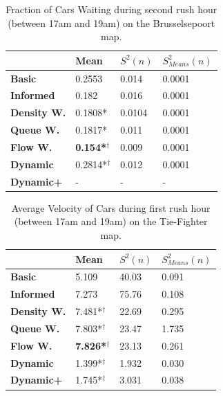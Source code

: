 \documentclass[11pt]{article}
\begin{document}
\begin{table}[H]
\centering
\caption{Fraction of Cars Waiting during second rush hour (between 17am and 19am) on the Brusselsepoort map.}
\label{my-label}
\begin{tabular}{l|l|l|l|}
\textbf{}                 & \textbf{Mean} & \textbf{$S^2(n)$} & \textbf{$S_{Means}^2(n)$} \\
\hline\textbf{Basic}      & 0.2553         & 0.014             & 0.0001                     \\
\textbf{Informed}   & 0.182          & 0.016             & 0.0001                     \\
\hline\textbf{Density W.} & 0.1808*         & 0.0104            & 0.0001                     \\
\textbf{Queue W.}   & 0.1817*         & 0.011             & 0.0001                     \\
\textbf{Flow W.}    & \textbf{0.154*$^\dagger$} & 0.009             & 0.0001                     \\
\textbf{Dynamic}    & 0.2814*$^\dagger$         & 0.012             & 0.0001                     \\
\textbf{Dynamic+}   & -              & -                 & -                         
\end{tabular}
\end{table}

\begin{table}[H]
\centering
\caption{Average Velocity of Cars during first rush hour (between 17am and 19am) on the Tie-Fighter map.}
\label{my-label}
\begin{tabular}{l|l|l|l|}
\textbf{}                 & \textbf{Mean} & \textbf{$S^2(n)$} & \textbf{$S_{Means}^2(n)$} \\
\hline\textbf{Basic}            & 5.109          & 40.03             & 0.091                      \\
\textbf{Informed}         & 7.273          & 75.76             & 0.108                      \\
\hline\textbf{Density W.} & 7.481*$^\dagger$          & 22.69             & 0.295                      \\
\textbf{Queue W.}   & 7.803*$^\dagger$          & 23.47             & 1.735                      \\
\textbf{Flow W.}    & \textbf{7.826*$^\dagger$} & 23.13             & 0.261                      \\
\textbf{Dynamic}          & 1.399*$^\dagger$          & 1.932             & 0.030                      \\
\textbf{Dynamic+}         & 1.745*$^\dagger$         & 3.031             & 0.038                     
\end{tabular}
\end{table}
\end{document}

